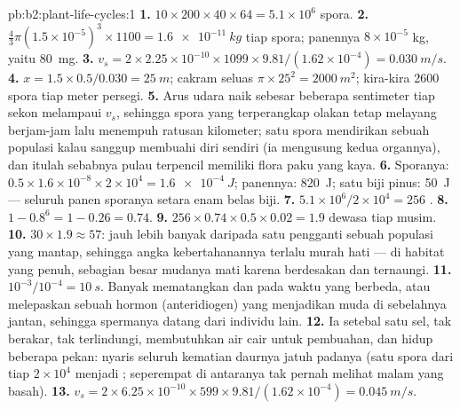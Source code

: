 \begin{solution}{pb:b2:plant-life-cycles:1}
\textbf{1.} $10\times 200\times 40\times 64 = 5.1\times 10^{6}$
spora.
\textbf{2.} $\tfrac43\pi(1.5\times 10^{-5})^3\times 1100 =
\qty{1.6e-11}{kg}$ tiap spora; panennya $8\times 10^{-5}$ kg, yaitu \qty{80}{mg}.
\textbf{3.} $v_s = 2\times 2.25\times 10^{-10}\times 1099\times
9.81/(1.62\times 10^{-4}) = \qty{0.030}{m/s}$.
\textbf{4.} $x = 1.5\times 0.5/0.030 = \qty{25}{m}$; cakram seluas
$\pi\times 25^2 = \qty{2000}{m^2}$; kira-kira \num{2600} spora tiap
meter persegi.
\textbf{5.} Arus udara naik sebesar beberapa sentimeter tiap sekon
melampaui $v_s$, sehingga spora yang terperangkap olakan tetap
melayang berjam-jam lalu menempuh ratusan kilometer; satu spora
mendirikan sebuah populasi kalau  sanggup membuahi diri
sendiri (ia mengusung kedua organnya), dan itulah sebabnya pulau
terpencil memiliki flora paku yang kaya.
\textbf{6.} Sporanya: $0.5\times 1.6\times 10^{-8}\times 2\times 10^{4} =
\qty{1.6e-4}{J}$; panennya: \qty{820}{J}; satu biji pinus: \qty{50}{J}
--- seluruh panen sporanya setara enam belas biji.
\textbf{7.} $5.1\times 10^{6}/2\times 10^{4} = 256$ .
\textbf{8.} $1 - 0.8^{6} = 1 - 0.26 = 0.74$.
\textbf{9.} $256\times 0.74\times 0.5\times 0.02 = 1.9$ 
dewasa tiap musim.
\textbf{10.} $30\times 1.9 \approx 57$: jauh lebih banyak daripada satu
pengganti sebuah populasi yang mantap, sehingga angka kebertahanannya
terlalu murah hati --- di habitat yang penuh, sebagian besar 
mudanya mati karena berdesakan dan ternaungi.
\textbf{11.} $10^{-3}/10^{-4} = \qty{10}{s}$. Banyak 
mematangkan  dan  pada waktu yang berbeda, atau
melepaskan sebuah hormon (anteridiogen) yang menjadikan  muda
di sebelahnya jantan, sehingga spermanya datang dari individu lain.
\textbf{12.} Ia setebal satu sel, tak berakar, tak terlindungi,
membutuhkan air cair untuk pembuahan, dan hidup beberapa pekan: nyaris
seluruh kematian daurnya jatuh padanya (satu spora dari
tiap $2\times 10^{4}$ menjadi ; seperempat di antaranya tak
pernah melihat malam yang basah).
\textbf{13.} $v_s = 2\times 6.25\times 10^{-10}\times 599\times
9.81/(1.62\times 10^{-4}) = \qty{0.045}{m/s}$.

\end{solution}
